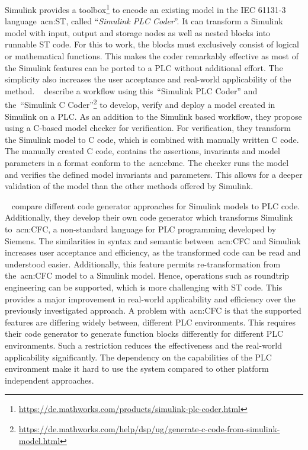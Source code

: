 Simulink provides a toolbox\footnote{\url{https://de.mathworks.com/products/simulink-plc-coder.html}} to encode an existing model in the IEC 61131-3 language~\acrshort{acn:ST}, called \enquote{\textit{Simulink PLC Coder}}.
It can transform a Simulink model with input, output and storage nodes as well as nested blocks into runnable ST code.
For this to work, the blocks must exclusively consist of logical or mathematical functions.
This makes the coder remarkably effective as most of the Simulink features can be ported to a PLC without additional effort.
The simplicity also increases the user acceptance and real-world applicability of the method.
\citeauthor{7535242}~\cite{7535242} describe a workflow using this~\enquote{Simulink PLC Coder} and the~\enquote{Simulink C Coder}\footnote{\url{https://de.mathworks.com/help/dsp/ug/generate-c-code-from-simulink-model.html}} to develop, verify and deploy a model created in Simulink on a PLC.
As an addition to the Simulink based workflow, they propose using a C-based model checker for verification.
For verification, they transform the Simulink model to C code, which is combined with manually written C code.
The manually created C code, contains the assertions, invariants and model parameters in a format conform to the~\acrfull{acn:cbmc}.
The checker runs the model and verifies the defined model invariants and parameters.
This allows for a deeper validation of the model than the other methods offered by Simulink.

\citeauthor{6489667}~\cite{6489667} compare different code generator approaches for Simulink models to PLC code.
Additionally, they develop their own code generator which transforms Simulink to~\acrfull{acn:CFC}, a non-standard language for PLC programming developed by Siemens.
The similarities in syntax and semantic between~\acrshort{acn:CFC} and Simulink increases user acceptance and efficiency, as the transformed code can be read and understood easier.
Additionally, this feature permits re-transformation from the~\acrshort{acn:CFC} model to a Simulink model.
Hence, operations such as roundtrip engineering can be supported, which is more challenging with ST code.
This provides a major improvement in real-world applicability and efficiency over the previously investigated approach.
A problem with~\acrshort{acn:CFC} is that the supported features are differing widely between, different PLC environments.
This requires their code generator to generate function blocks differently for different PLC environments.
Such a restriction reduces the effectiveness and the real-world applicability significantly.
The dependency on the capabilities of the PLC environment make it hard to use the system compared to other platform independent approaches.

